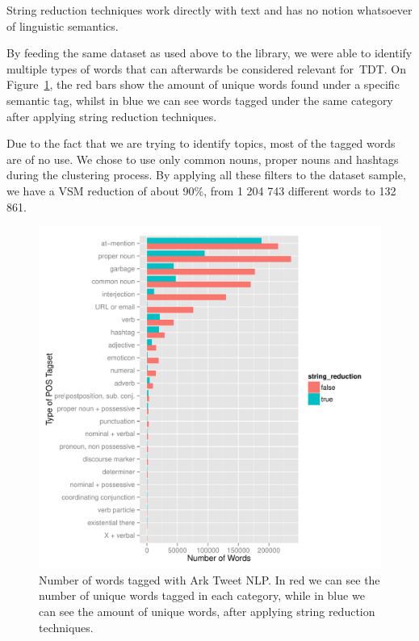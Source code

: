 \documentclass[journal]{IEEEtran}
\begin{document}
String reduction techniques work directly with text and has no notion whatsoever of linguistic semantics. 

By feeding the same dataset as used above to the library, we were able to identify multiple types of words that can afterwards be considered relevant for~\ac{TDT}. On Figure~\ref{fig:wordcount_nlp}, the red bars show the amount of unique words found under a specific semantic tag, whilst in blue we can see words tagged under the same category after applying string reduction techniques.

Due to the fact that we are trying to identify topics, most of the tagged words are of no use. We chose to use only common nouns, proper nouns and hashtags during the clustering process. By applying all these filters to the dataset sample, we have a \ac{VSM} reduction of about 90\%, from 1 204 743 different words to 132 861.

\begin{figure}[h]
  \centering
  \includegraphics[width=1\linewidth]{./plots/svm/plot_wordcount_nlp.pdf}
  \caption{Number of words tagged with Ark Tweet NLP. In red we can see the number of unique words tagged in each category, while in blue we can see the amount of unique words, after applying string reduction techniques.}
  \label{fig:wordcount_nlp}
\end{figure}
\end{document}
